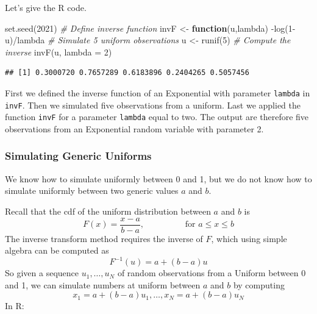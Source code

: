 \documentclass[
]{book}
\newenvironment{Shaded}{\begin{snugshade}}{\end{snugshade}}
\newcommand{\AttributeTok}[1]{\textcolor[rgb]{0.77,0.63,0.00}{#1}}
\newcommand{\CommentTok}[1]{\textcolor[rgb]{0.56,0.35,0.01}{\textit{#1}}}
\newcommand{\ControlFlowTok}[1]{\textcolor[rgb]{0.13,0.29,0.53}{\textbf{#1}}}
\newcommand{\DecValTok}[1]{\textcolor[rgb]{0.00,0.00,0.81}{#1}}
\newcommand{\FunctionTok}[1]{\textcolor[rgb]{0.00,0.00,0.00}{#1}}
\newcommand{\NormalTok}[1]{#1}
\newcommand{\OtherTok}[1]{\textcolor[rgb]{0.56,0.35,0.01}{#1}}
\newcommand{\SpecialCharTok}[1]{\textcolor[rgb]{0.00,0.00,0.00}{#1}}
\theoremstyle{definition}
\theoremstyle{definition}
\theoremstyle{definition}
\theoremstyle{definition}
\theoremstyle{remark}
\begin{document}
Let's give the R code.

\begin{Shaded}
\begin{Highlighting}[]
\FunctionTok{set.seed}\NormalTok{(}\DecValTok{2021}\NormalTok{)}
\CommentTok{\# Define inverse function}
\NormalTok{invF }\OtherTok{\textless{}{-}} \ControlFlowTok{function}\NormalTok{(u,lambda) }\SpecialCharTok{{-}}\FunctionTok{log}\NormalTok{(}\DecValTok{1}\SpecialCharTok{{-}}\NormalTok{u)}\SpecialCharTok{/}\NormalTok{lambda}
\CommentTok{\# Simulate 5 uniform observations}
\NormalTok{u }\OtherTok{\textless{}{-}} \FunctionTok{runif}\NormalTok{(}\DecValTok{5}\NormalTok{)}
\CommentTok{\# Compute the inverse }
\FunctionTok{invF}\NormalTok{(u, }\AttributeTok{lambda =} \DecValTok{2}\NormalTok{)}
\end{Highlighting}
\end{Shaded}

\begin{verbatim}
## [1] 0.3000720 0.7657289 0.6183896 0.2404265 0.5057456
\end{verbatim}

First we defined the inverse function of an Exponential with parameter \texttt{lambda} in \texttt{invF}. Then we simulated five observations from a uniform. Last we applied the function \texttt{invF} for a parameter \texttt{lambda} equal to two. The output are therefore five observations from an Exponential random variable with parameter 2.

\hypertarget{simulating-generic-uniforms}{%
\subsubsection{Simulating Generic Uniforms}\label{simulating-generic-uniforms}}

We know how to simulate uniformly between 0 and 1, but we do not know how to simulate uniformly between two generic values \(a\) and \(b\).

Recall that the cdf of the uniform distribution between \(a\) and \(b\) is
\[
F(x)=\frac{x-a}{b-a}, \hspace{2cm} \mbox{for } a\leq x \leq b
\]
The inverse transform method requires the inverse of \(F\), which using simple algebra can be computed as
\[
F^{-1}(u)=a + (b-a)u
\]
So given a sequence \(u_1,\dots,u_N\) of random observations from a Uniform between 0 and 1, we can simulate numbers at uniform between \(a\) and \(b\) by computing
\[
x_1 = a + (b-a)u_1,\dots, x_N=a+(b-a)u_N
\]
In R:
\end{document}
